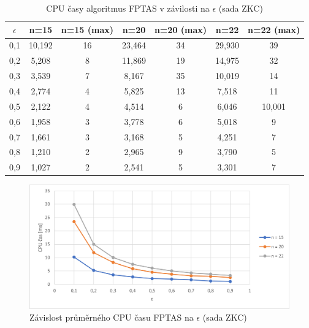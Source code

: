 \documentclass[12pt]{article}
\begin{document}
\begin{table}
    \begin{center}
         \begin{tabular}{|c | c | c | c | c | c | c|} 
         \hline
         $\epsilon$ & n=15 & n=15 (max) & n=20 & n=20 (max) & n=22 & n=22 (max) \\ [0.1ex] 
         \hline\hline
        0,1 & 10,192 & 16 & 23,464 & 34 & 29,930 & 39 \\
        \hline
        0,2 & 5,208 & 8 & 11,869 & 19 & 14,975 & 32 \\
        \hline
        0,3 & 3,539 & 7 & 8,167 & 35 & 10,019 & 14 \\
        \hline
        0,4 & 2,774 & 4 & 5,825 & 13 & 7,518 & 11 \\
        \hline
        0,5 & 2,122 & 4 & 4,514 & 6 & 6,046 & 10,001 \\
        \hline
        0,6 & 1,958 & 3 & 3,778 & 6 & 5,018 & 9 \\
        \hline
        0,7 & 1,661 & 3 & 3,168 & 5 & 4,251 & 7 \\
        \hline
        0,8 & 1,210 & 2 & 2,965 & 9 & 3,790 & 5 \\
        \hline
        0,9 & 1,027 & 2 & 2,541 & 5 & 3,301 & 7 \\
        \hline
        \end{tabular}
        \caption{CPU časy algoritmus FPTAS v závilosti na $\epsilon$ (sada ZKC)} \label{tab:zkc_fptas_eps_times}
    \end{center}
\end{table}

\begin{figure}[ht]\centering
    \includegraphics[width=1\textwidth, keepaspectratio]{graphs/ZKC/fptas/zkc_fptas_time_eps_avg.png}
    \caption{Závislost průměrného CPU času FPTAS na $\epsilon$ (sada ZKC)}
    \label{fig:zkc_fptas_eps_time_avg}
\end{figure}
\end{document}
